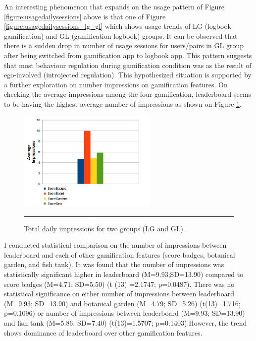 An interesting phenomenon that expands on the usage pattern of Figure \ref{figure:usagedailysessions} above is that one of Figure \ref{figure:usagedailysessions_lg_gl} which shows usage trends of LG (logbook-gamification) and GL (gamification-logbook) groups. It can be observed that there is a sudden drop in number of usage sessions for users/pairs in GL group after being switched from gamification app to logbook app. This pattern suggests that most behaviour regulation during gamification condition was as the result of ego-involved (introjected regulation). This hypothesized situation is supported by a further exploration on number impressions on gamification features. On checking the average impressions among the four gamification, leaderboard seems to be having the highest average number of impressions as shown on Figure \ref{figure:gamification_impressions_latest_all}. 
\begin{figure}[htbp]
  \centering
    \includegraphics[width=0.6\textwidth]{Figures/gamification_impressions_latest_all.png}
    \rule{35em}{0.5pt}
  \caption{Total daily impressions for two groups (LG and GL).}
  \label{figure:gamification_impressions_latest_all}
\end{figure}
I conducted statistical comparison on the number of impressions between leaderboard and each of other gamification features (score badges, botanical garden, and fish tank). It was found that the number of impressions was statistically significant higher in leaderboard (M=9.93;SD=13.90) compared to score badges (M=4.71; SD=5.50) (t (13) =2.1747; p=0.0487). There was no statistical significance on either number of impressions between leaderboard (M=9.93; SD=13.90) and botanical garden (M=4.79; SD=5.26) (t(13)=1.716; p=0.1096) or number of impressions between leaderboard (M=9.93; SD=13.90) and fish tank (M=5.86; SD=7.40) (t(13)=1.5707; p=0.1403).However, the trend shows dominance of leaderboard over other gamification features. 

